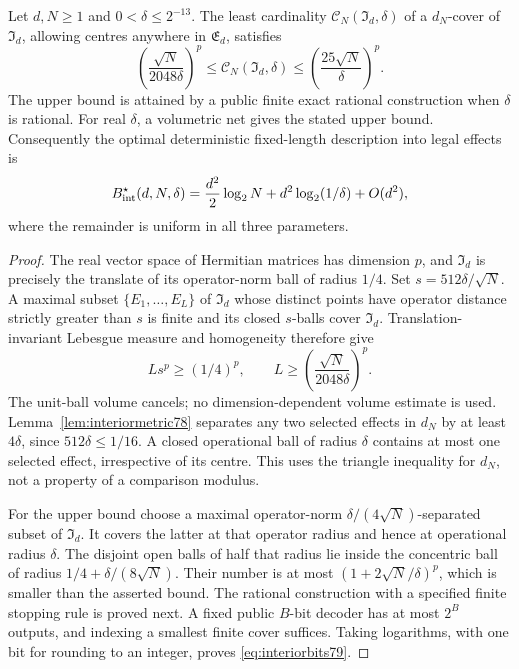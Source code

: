 \begin{theorem}
\label{thm:interiorentropy79}
Let $d,N\ge1$ and $0<\delta\le2^{-13}$.  The least cardinality
$\mathcal C_N(\mathfrak I_d,\delta)$ of a $d_N$-cover of
$\mathfrak I_d$, allowing centres anywhere in $\mathfrak E_d$, satisfies
\begin{equation}\label{eq:interiorentropy79}
 \left(\frac{\sqrt N}{2048\delta}\right)^{p}
 \le \mathcal C_N(\mathfrak I_d,\delta)
 \le \left(\frac{25\sqrt N}{\delta}\right)^{p}.
\end{equation}
The upper bound is attained by a public finite exact rational
construction when $\delta$ is rational.  For real $\delta$, a
volumetric net gives the stated upper bound.  Consequently the
optimal deterministic fixed-length description into legal effects is
\begin{equation}\label{eq:interiorbits79}
 B_{\rm int}^{\star}(d,N,\delta)
 =\frac{d^2}{2}\log_2 N+d^2\log_2(1/\delta)+O(d^2),
\end{equation}
where the remainder is uniform in all three parameters.
\end{theorem}
\begin{proof}
The real vector space of Hermitian matrices has dimension $p$, and
$\mathfrak I_d$ is precisely the translate of its operator-norm ball
of radius $1/4$.  Set $s=512\delta/\sqrt N$.  A maximal subset
$\{E_1,\ldots,E_L\}$ of $\mathfrak I_d$ whose distinct points have
operator distance strictly greater than $s$ is finite and its closed
$s$-balls cover $\mathfrak I_d$.  Translation-invariant Lebesgue
measure and homogeneity therefore give
\[
 Ls^p\ge(1/4)^p,
 \qquad L\ge\left(\frac{\sqrt N}{2048\delta}\right)^p.
\]
The unit-ball volume cancels; no dimension-dependent volume estimate
is used.  Lemma~\ref{lem:interiormetric78} separates any two selected
effects in $d_N$ by at least $4\delta$, since $512\delta\le1/16$.
A closed operational ball of radius $\delta$ contains at most one
selected effect, irrespective of its centre.  This uses the triangle
inequality for $d_N$, not a property of a comparison modulus.

For the upper bound choose a maximal operator-norm
$\delta/(4\sqrt N)$-separated subset of $\mathfrak I_d$.
It covers the latter at that operator radius and hence at operational
radius $\delta$.  The disjoint open balls of half that radius lie
inside the concentric ball of radius
$1/4+\delta/(8\sqrt N)$.  Their number is at most
$(1+2\sqrt N/\delta)^p$, which is smaller than the asserted bound.
The rational construction with a specified finite stopping rule is
proved next.  A fixed public $B$-bit decoder has at most $2^B$
outputs, and indexing a smallest finite cover suffices.  Taking
logarithms, with one bit for rounding to an integer, proves
\eqref{eq:interiorbits79}.
\end{proof}

